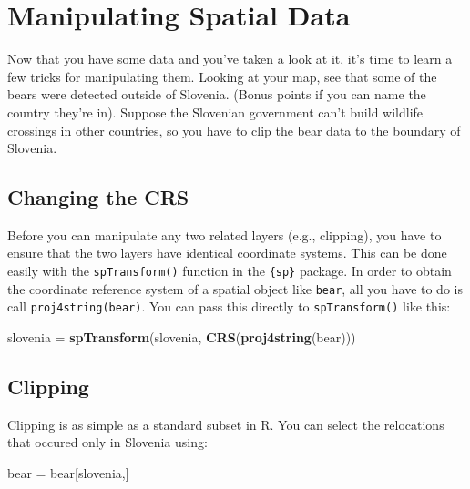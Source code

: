 \documentclass[]{book}
\newenvironment{Shaded}{\begin{snugshade}}{\end{snugshade}}
\newcommand{\KeywordTok}[1]{\textcolor[rgb]{0.13,0.29,0.53}{\textbf{#1}}}
\newcommand{\NormalTok}[1]{#1}
\newcommand{\StringTok}[1]{\textcolor[rgb]{0.31,0.60,0.02}{#1}}
\begin{document}
\hypertarget{ManipSpat}{%
\section{Manipulating Spatial Data}\label{ManipSpat}}

Now that you have some data and you've taken a look at it, it's time to learn a few tricks for manipulating them. Looking at your map, see that some of the bears were detected outside of Slovenia. (Bonus points if you can name the country they're in). Suppose the Slovenian government can't build wildlife crossings in other countries, so you have to clip the bear data to the boundary of Slovenia.

\hypertarget{crs}{%
\subsection{Changing the CRS}\label{crs}}

Before you can manipulate any two related layers (e.g., clipping), you have to ensure that the two layers have identical coordinate systems. This can be done easily with the \texttt{spTransform()} function in the \texttt{\{sp\}} package. In order to obtain the coordinate reference system of a spatial object like \texttt{bear}, all you have to do is call \texttt{proj4string(bear)}. You can pass this directly to \texttt{spTransform()} like this:

\begin{Shaded}
\begin{Highlighting}[]
\NormalTok{slovenia =}\StringTok{ }\KeywordTok{spTransform}\NormalTok{(slovenia, }\KeywordTok{CRS}\NormalTok{(}\KeywordTok{proj4string}\NormalTok{(bear))) }
\end{Highlighting}
\end{Shaded}

\hypertarget{clip}{%
\subsection{Clipping}\label{clip}}

Clipping is as simple as a standard subset in R. You can select the relocations that occured only in Slovenia using:

\begin{Shaded}
\begin{Highlighting}[]
\NormalTok{bear =}\StringTok{ }\NormalTok{bear[slovenia,]}
\end{Highlighting}
\end{Shaded}
\end{document}
